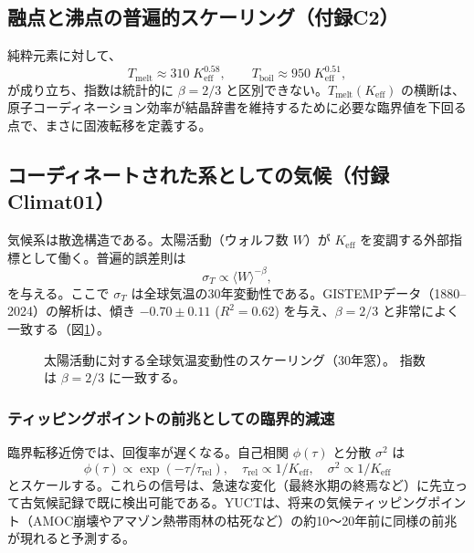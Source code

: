 \documentclass[12pt,a4paper]{article}
\newcommand{\Keff}{K_{\mathrm{eff}}}
\begin{document}
	\subsection{融点と沸点の普遍的スケーリング（付録C2）}
	
	純粋元素に対して、
	\[
	T_{\text{melt}} \approx 310\;\Keff^{0.58}, \qquad
	T_{\text{boil}} \approx 950\;\Keff^{0.51},
	\]
	が成り立ち、指数は統計的に \(\beta = 2/3\) と区別できない。\(T_{\text{melt}}(\Keff)\) の横断は、原子コーディネーション効率が結晶辞書を維持するために必要な臨界値を下回る点で、まさに固液転移を定義する。
	
	\subsection{コーディネートされた系としての気候（付録Climat01）}
	
	気候系は散逸構造である。太陽活動（ウォルフ数 \(W\)）が \(\Keff\) を変調する外部指標として働く。普遍的誤差則は
	\[
	\sigma_T \propto \langle W \rangle^{-\beta},
	\]
	を与える。ここで \(\sigma_T\) は全球気温の30年変動性である。GISTEMPデータ（1880–2024）の解析は、傾き \(-0.70\pm0.11\) (\(R^2=0.62\)) を与え、\(\beta = 2/3\) と非常によく一致する（図\ref{fig:climate_scaling}）。
	
	\begin{figure}[H]
		\centering
		\caption{太陽活動に対する全球気温変動性のスケーリング（30年窓）。
			指数は \(\beta = 2/3\) に一致する。}
		\label{fig:climate_scaling}
	\end{figure}
	
	\subsubsection{ティッピングポイントの前兆としての臨界的減速}
	
	臨界転移近傍では、回復率が遅くなる。自己相関 \(\phi(\tau)\) と分散 \(\sigma^2\) は
	\[
	\phi(\tau) \propto \exp(-\tau/\tau_{\text{rel}}),\quad
	\tau_{\text{rel}} \propto 1/\Keff,\quad
	\sigma^2 \propto 1/\Keff
	\]
	とスケールする。これらの信号は、急速な変化（最終氷期の終焉など）に先立って古気候記録で既に検出可能である。YUCTは、将来の気候ティッピングポイント（AMOC崩壊やアマゾン熱帯雨林の枯死など）の約10～20年前に同様の前兆が現れると予測する。
	
\end{document}
